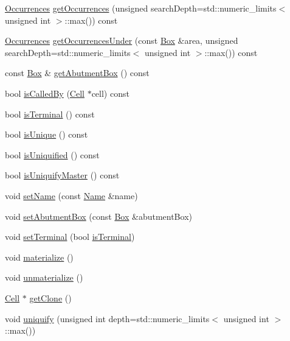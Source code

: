 \begin{DoxyCompactItemize}
\mbox{\hyperlink{namespaceHurricane_a1912927c128eee859af62dbe4cbe0a6b}{Occurrences}} \mbox{\hyperlink{classHurricane_1_1Cell_ab5bbab0a59106855d61deb94805e6115}{get\+Occurrences}} (unsigned search\+Depth=std\+::numeric\+\_\+limits$<$ unsigned int $>$\+::max()) const
\item 
\mbox{\hyperlink{namespaceHurricane_a1912927c128eee859af62dbe4cbe0a6b}{Occurrences}} \mbox{\hyperlink{classHurricane_1_1Cell_a7fb09c8e350923c47ce4c4407bdb00ce}{get\+Occurrences\+Under}} (const \mbox{\hyperlink{classHurricane_1_1Box}{Box}} \&area, unsigned search\+Depth=std\+::numeric\+\_\+limits$<$ unsigned int $>$\+::max()) const
\item 
const \mbox{\hyperlink{classHurricane_1_1Box}{Box}} \& \mbox{\hyperlink{classHurricane_1_1Cell_a142360ca7b3c1c637894f5b9a2cac069}{get\+Abutment\+Box}} () const
\item 
bool \mbox{\hyperlink{classHurricane_1_1Cell_a239354e1b4ad9b751abf5a064e43b0e6}{is\+Called\+By}} (\mbox{\hyperlink{classHurricane_1_1Cell}{Cell}} $\ast$cell) const
\item 
bool \mbox{\hyperlink{classHurricane_1_1Cell_aac4e9218b7806f3a0f2d5a55f00abd69}{is\+Terminal}} () const
\item 
bool \mbox{\hyperlink{classHurricane_1_1Cell_a6c2f2fd9f6f6e0578937a90c0c37a507}{is\+Unique}} () const
\item 
bool \mbox{\hyperlink{classHurricane_1_1Cell_a86c21867e9ce896eae72fd2999ce8a2d}{is\+Uniquified}} () const
\item 
bool \mbox{\hyperlink{classHurricane_1_1Cell_a0220dbbbe730e6874f7620135e9c10f6}{is\+Uniquify\+Master}} () const
\item 
void \mbox{\hyperlink{classHurricane_1_1Cell_ad2c9face922062664110c66ee205eab2}{set\+Name}} (const \mbox{\hyperlink{classHurricane_1_1Name}{Name}} \&name)
\item 
void \mbox{\hyperlink{classHurricane_1_1Cell_ab1949e2b708f0bd2d215ab90cfe864e0}{set\+Abutment\+Box}} (const \mbox{\hyperlink{classHurricane_1_1Box}{Box}} \&abutment\+Box)
\item 
void \mbox{\hyperlink{classHurricane_1_1Cell_a4591dc37153a835daa42b442221742cb}{set\+Terminal}} (bool \mbox{\hyperlink{classHurricane_1_1Cell_aac4e9218b7806f3a0f2d5a55f00abd69}{is\+Terminal}})
\item 
void \mbox{\hyperlink{classHurricane_1_1Cell_affefc597317063857f4904d4b16d5d4f}{materialize}} ()
\item 
void \mbox{\hyperlink{classHurricane_1_1Cell_a40c9ba4e3fc76b0c4bc58af8dcaddf53}{unmaterialize}} ()
\item 
\mbox{\hyperlink{classHurricane_1_1Cell}{Cell}} $\ast$ \mbox{\hyperlink{classHurricane_1_1Cell_a092f53c7f517ecc70d9ba375296c5d5b}{get\+Clone}} ()
\item 
void \mbox{\hyperlink{classHurricane_1_1Cell_aa113c121813342b6304f3e7fddbc8565}{uniquify}} (unsigned int depth=std\+::numeric\+\_\+limits$<$ unsigned int $>$\+::max())
\end{DoxyCompactItemize}
